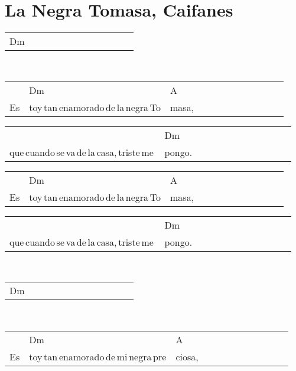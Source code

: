 \section*{La Negra Tomasa, Caifanes\hfill}
\begin{multicols}{2}
\noindent
\begin{minipage}{\columnwidth}
\noindent
\noindent
\begin{tabular}{llllllllllll}
Dm\\

\end{tabular}
\end{minipage}\\

\noindent
\begin{minipage}{\columnwidth}
\noindent
\noindent
\begin{tabular}{llllllllllll}
&Dm&A\\
Es&toy\,tan\,enamorado\,de\,la\,negra\,To&masa,
\end{tabular}

\noindent
\begin{tabular}{llllllllllll}
&Dm\\
que\,cuando\,se\,va\,de\,la\,casa,\,triste\,me\,&pongo.
\end{tabular}

\noindent
\begin{tabular}{llllllllllll}
&Dm&A\\
Es&toy\,tan\,enamorado\,de\,la\,negra\,To&masa,
\end{tabular}

\noindent
\begin{tabular}{llllllllllll}
&Dm\\
que\,cuando\,se\,va\,de\,la\,casa,\,triste\,me\,&pongo.
\end{tabular}
\end{minipage}\\

\noindent
\begin{minipage}{\columnwidth}
\noindent
\noindent
\begin{tabular}{llllllllllll}
Dm\\

\end{tabular}
\end{minipage}\\

\noindent
\begin{minipage}{\columnwidth}
\noindent
\noindent
\begin{tabular}{llllllllllll}
&Dm&A\\
Es&toy\,tan\,enamorado\,de\,mi\,negra\,pre&ciosa,
\end{tabular}


\end{minipage}
\end{multicols}
